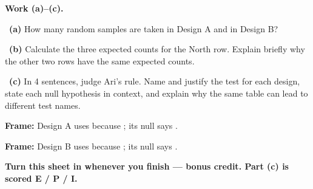 \documentclass[11pt]{article}
\begin{document}
\newpage
\textbf{Work (a)--(c).}\par\smallskip

~\textbf{(a)} How many random samples are taken in Design A and in Design B?\par
\workspace{0.7in}

~\textbf{(b)} Calculate the three expected counts for the North row. Explain briefly why the other two rows have the same expected counts.\par
\workspace{1.4in}

~\textbf{(c)} In 4 sentences, judge Ari's rule. Name and justify the test for each design, state each null hypothesis in context, and explain why the same table can lead to different test names.\par
\workspace{2.0in}

\begin{sentenceframebox}\raggedright\textbf{Frame:} Design A uses \blank[1.4in] because \blank[1.8in]; its null says \blank[2.0in].\end{sentenceframebox}

\begin{sentenceframebox}\raggedright\textbf{Frame:} Design B uses \blank[1.4in] because \blank[1.8in]; its null says \blank[2.0in].\end{sentenceframebox}

\textbf{Turn this sheet in whenever you finish --- bonus credit. Part (c) is scored E / P / I.}\par
\end{document}
